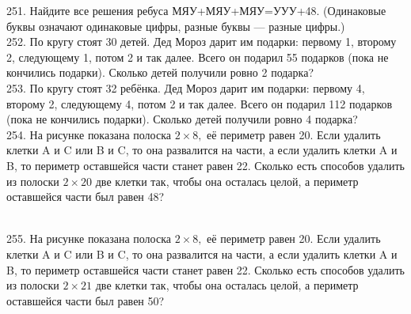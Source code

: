 \documentclass[12pt]{article}
\begin{document}
251. Найдите все решения ребуса МЯУ+МЯУ+МЯУ=УУУ+48. (Одинаковые буквы означают одинаковые цифры, разные буквы --- разные цифры.)\\
252. По кругу стоят 30 детей. Дед Мороз дарит им подарки: первому 1, второму 2, следующему 1, потом 2 и так далее. Всего он подарил 55 подарков (пока не кончились подарки). Сколько детей получили ровно 2 подарка?\\
253. По кругу стоят 32 ребёнка. Дед Мороз дарит им подарки: первому 4, второму 2, следующему 4, потом 2 и так далее. Всего он подарил 112 подарков (пока не кончились подарки). Сколько детей получили ровно 4 подарка?\\
254. На рисунке показана полоска $2\times 8,$ её периметр равен 20. Если удалить клетки A и C или B и C, то она развалится на части, а если удалить клетки A и B, то периметр оставшейся части станет равен 22. Сколько есть способов удалить из полоски $2\times 20$ две клетки так, чтобы она осталась целой, а периметр оставшейся части был равен 48?
\begin{figure}[ht!]
\end{figure}\\
255. На рисунке показана полоска $2\times 8,$ её периметр равен 20. Если удалить клетки A и C или B и C, то она развалится на части, а если удалить клетки A и B, то периметр оставшейся части станет равен 22. Сколько есть способов удалить из полоски $2\times 21$ две клетки так, чтобы она осталась целой, а периметр оставшейся части был равен 50?
\begin{figure}[ht!]
\end{figure}\\
\end{document}
